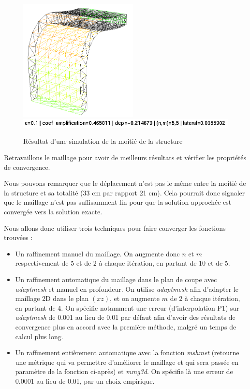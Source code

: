     \begin{figure}        
        \begin{center}
        
            \includegraphics[width=6cm]{imgs/half_simu.PNG}
            \includegraphics[width=12cm ]{imgs/half_simu_label.PNG}
            \caption{Résultat d'une simulation de la moitié de la structure}
            \label{fig:simu_def_moitie}
        
        \end{center}
    \end{figure}


\begin{problem}{4}
    Retravaillons le maillage pour avoir de meilleurs résultats et vérifier les propriétés de convergence.
\end{problem}

    Nous pouvons remarquer que le déplacement n'est pas le même entre la moitié de la structure et sa totalité (33 cm par rapport 21 cm).
    Cela pourrait donc signaler que le maillage n'est pas suffisamment fin pour que la solution approchée est convergée vers la solution exacte.

    Nous allons donc utiliser trois techniques pour faire converger les fonctions trouvées :
    \begin{itemize}
        \item Un raffinement manuel du maillage. On augmente donc $n$ et $m$ respectivement de 5 et de 2 à chaque itération, en partant de 10 et de 5.
        \item Un raffinement automatique du maillage dans le plan de coupe avec \emph{adaptmesh} et manuel en profondeur. On utilise \emph{adaptmesh} afin d'adapter le maillage 2D
        dans le plan $(xz)$,
                et on augmente $m$ de 2 à chaque itération, en partant de 4. On spécifie 
                notamment une erreur (d'interpolation P1) sur \emph{adaptmesh} de 0.001 au lieu de 0.01 par défaut afin d'avoir des 
                résultats de convergence plus en accord avec la première méthode, malgré un temps de calcul plus long.
        \item Un raffinement entièrement automatique avec la fonction \emph{mshmet} (retourne une métrique qui va permettre
        d'améliorer le maillage et qui sera passée en paramètre de la fonction ci-après) et \emph{mmg3d}.
            On spécifie là une erreur de 0.0001 au lieu de 0.01, par un choix empirique.
    \end{itemize}
    
